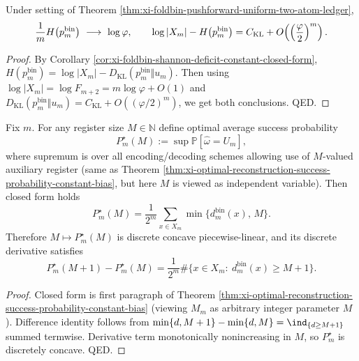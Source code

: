 \begin{corollary}\label{cor:xi-foldbin-entropy-rate-rigidity}
Under setting of Theorem \ref{thm:xi-foldbin-pushforward-uniform-two-atom-ledger},
\[
\frac{1}{m}H\bigl(p^{\mathrm{bin}}_m\bigr)\ \longrightarrow\ \log\varphi,
\qquad
\log|X_m|-H\bigl(p^{\mathrm{bin}}_m\bigr)=C_{\mathrm{KL}}+O\!\left(\Bigl(\frac{\varphi}{2}\Bigr)^m\right).
\]
\end{corollary}
\begin{proof}
By Corollary \ref{cor:xi-foldbin-shannon-deficit-constant-closed-form},
\(
H(p^{\mathrm{bin}}_m)=\log|X_m|-D_{\mathrm{KL}}(p^{\mathrm{bin}}_m\Vert u_m)
\).
Then using \(\log|X_m|=\log F_{m+2}=m\log\varphi+O(1)\) and \(D_{\mathrm{KL}}(p^{\mathrm{bin}}_m\Vert u_m)=C_{\mathrm{KL}}+O((\varphi/2)^m)\), we get both conclusions. QED.
\end{proof}

\begin{proposition}\label{prop:xi-reconstruction-success-curve-discrete-derivative}
Fix \(m\).
For any register size \(M\in\mathbb N\) define optimal average success probability
\[
P_m^\star(M):=\sup\mathbb P[\widehat\omega=U_m],
\]
where supremum is over all encoding/decoding schemes allowing use of \(M\)-valued auxiliary register (same as Theorem \ref{thm:xi-optimal-reconstruction-success-probability-constant-bias}, but here \(M\) is viewed as independent variable).
Then closed form holds
\[
P_m^\star(M)=\frac{1}{2^m}\sum_{x\in X_m}\min\!\bigl\{d^{\mathrm{bin}}_m(x),\,M\bigr\}.
\]
Therefore \(M\mapsto P_m^\star(M)\) is discrete concave piecewise-linear, and its discrete derivative satisfies
\[
P_m^\star(M+1)-P_m^\star(M)=\frac{1}{2^m}\#\{x\in X_m:\ d^{\mathrm{bin}}_m(x)\ge M+1\}.
\]
\end{proposition}

\begin{proof}
Closed form is first paragraph of Theorem \ref{thm:xi-optimal-reconstruction-success-probability-constant-bias} (viewing \(M_m\) as arbitrary integer parameter \(M\)).
Difference identity follows from
\(
\min\{d,M+1\}-\min\{d,M\}=\ind_{\{d\ge M+1\}}
\)
summed termwise.
Derivative term monotonically nonincreasing in \(M\), so \(P_m^\star\) is discretely concave. QED.
\end{proof}
\endinput
